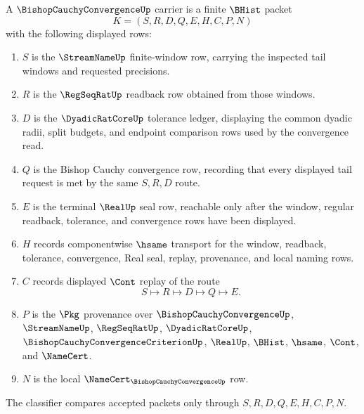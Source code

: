 \begin{definition}
\label{def:bishop-cauchy-convergence-carrier}
A $\BishopCauchyConvergenceUp$ carrier is a finite $\BHist$ packet
$$
K=(S,R,D,Q,E,H,C,P,N)
$$
with the following displayed rows:
\begin{enumerate}
\item $S$ is the $\StreamNameUp$ finite-window row, carrying the inspected tail windows and requested precisions.
\item $R$ is the $\RegSeqRatUp$ readback row obtained from those windows.
\item $D$ is the $\DyadicRatCoreUp$ tolerance ledger, displaying the common dyadic radii, split budgets, and endpoint comparison rows used by the convergence read.
\item $Q$ is the Bishop Cauchy convergence row, recording that every displayed tail request is met by the same $S,R,D$ route.
\item $E$ is the terminal $\RealUp$ seal row, reachable only after the window, regular readback, tolerance, and convergence rows have been displayed.
\item $H$ records componentwise $\hsame$ transport for the window, readback, tolerance, convergence, Real seal, replay, provenance, and local naming rows.
\item $C$ records displayed $\Cont$ replay of the route
$$
S \longmapsto R \longmapsto D \longmapsto Q \longmapsto E .
$$
\item $P$ is the $\Pkg$ provenance over $\BishopCauchyConvergenceUp$, $\StreamNameUp$, $\RegSeqRatUp$, $\DyadicRatCoreUp$, $\BishopCauchyConvergenceCriterionUp$, $\RealUp$, $\BHist$, $\hsame$, $\Cont$, and $\NameCert$.
\item $N$ is the local $\NameCert_{\BishopCauchyConvergenceUp}$ row.
\end{enumerate}
The classifier compares accepted packets only through $S,R,D,Q,E,H,C,P,N$.
\end{definition}

